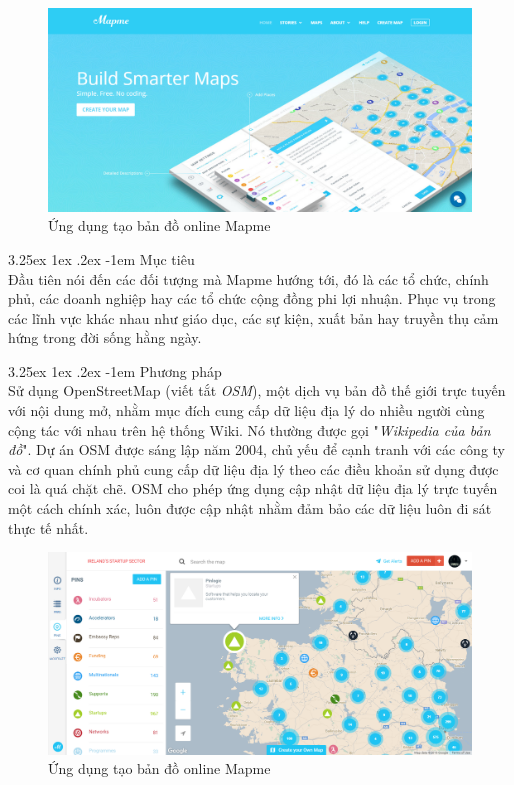 \documentclass[12pt,a4paper,twoside]{article}
\makeatletter
\newcommand{\myparagraph}[1]{\paragraph{#1}\mbox{}\\} %
\renewcommand\paragraph{\@startsection{paragraph}{5}{\z@}%
  {3.25ex \@plus1ex \@minus.2ex}%
  {-1em}%
  {\normalfont\normalsize\bfseries}}
\makeatother
\begin{document}
\begin{figure}[!h]
	\begin{center}
    \includegraphics[scale=.4]{image/mapme}
    \caption{Ứng dụng tạo bản đồ online Mapme}
    \label{fig:mapme}
    \end{center}
\end{figure}

\myparagraph{Mục tiêu}
Đầu tiên nói đến các đối tượng mà Mapme hướng tới, đó là các tổ chức, chính phủ, các doanh nghiệp hay các tổ chức cộng đồng phi lợi nhuận. Phục vụ trong các lĩnh vực khác nhau như giáo dục, các sự kiện, xuất bản hay truyền thụ cảm hứng trong đời sống hằng ngày.

\myparagraph{Phương pháp}
Sử dụng OpenStreetMap (viết tắt \textit{OSM})\cite{osm}, một dịch vụ bản đồ thế giới trực tuyến với nội dung mở, nhằm mục đích cung cấp dữ liệu địa lý do nhiều người cùng cộng tác với nhau trên hệ thống Wiki. Nó thường được gọi "\textit{Wikipedia của bản đồ}". Dự án OSM được sáng lập năm 2004, chủ yếu để cạnh tranh với các công ty và cơ quan chính phủ cung cấp dữ liệu địa lý theo các điều khoản sử dụng được coi là quá chặt chẽ. OSM cho phép ứng dụng cập nhật dữ liệu địa lý trực tuyến một cách chính xác, luôn được cập nhật nhằm đảm bảo các dữ liệu luôn đi sát thực tế nhất.

\begin{figure}[!h]
	\begin{center}
    \includegraphics[scale=.4]{image/mapmeOSM}
    \caption{Ứng dụng tạo bản đồ online Mapme}
    \label{fig:mapmeOSM}
	\end{center}
\end{figure}
\end{document}
